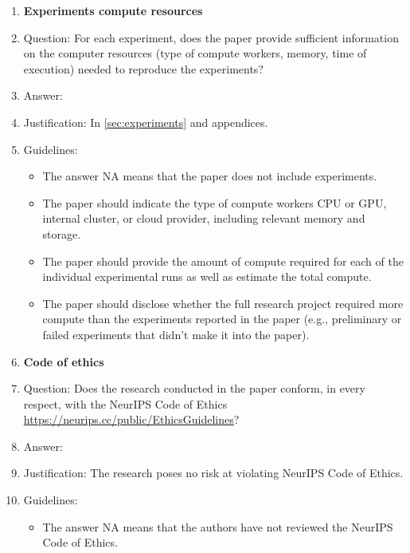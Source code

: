 \documentclass{article}
\begin{document}
\begin{enumerate}
\begin{itemize}
        \item For asymmetric distributions, the authors should be careful not to show in tables or figures symmetric error bars that would yield results that are out of range (e.g. negative error rates).
        \item If error bars are reported in tables or plots, The authors should explain in the text how they were calculated and reference the corresponding figures or tables in the text.
    \end{itemize}
\item {\bf Experiments compute resources}
    \item[] Question: For each experiment, does the paper provide sufficient information on the computer resources (type of compute workers, memory, time of execution) needed to reproduce the experiments?
    \item[] Answer: \answerYes{}
    \item[] Justification:  In \cref{sec:experiments} and appendices.
    \item[] Guidelines:
    \begin{itemize}
        \item The answer NA means that the paper does not include experiments.
        \item The paper should indicate the type of compute workers CPU or GPU, internal cluster, or cloud provider, including relevant memory and storage.
        \item The paper should provide the amount of compute required for each of the individual experimental runs as well as estimate the total compute.
        \item The paper should disclose whether the full research project required more compute than the experiments reported in the paper (e.g., preliminary or failed experiments that didn't make it into the paper).
    \end{itemize}
\item {\bf Code of ethics}
    \item[] Question: Does the research conducted in the paper conform, in every respect, with the NeurIPS Code of Ethics \url{https://neurips.cc/public/EthicsGuidelines}?
    \item[] Answer: \answerYes{}
    \item[] Justification: The research poses no risk at violating NeurIPS Code of Ethics.
    \item[] Guidelines:
    \begin{itemize}
        \item The answer NA means that the authors have not reviewed the NeurIPS Code of Ethics.

\end{itemize}
\end{enumerate}
\end{document}
